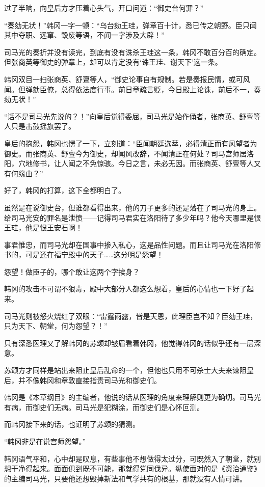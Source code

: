 过了半晌，向皇后方才压着心头气，开口问道：“御史台何罪？”

“奏劾无状！”韩冈一字一顿：“乌台劾王珪，弹章百十计，悉已传之朝野。臣只闻其中夺职、远窜、毁废等语，不闻一字涉及大辟！”

司马光的奏折并没有读完，到底有没有诛杀王珪这一条，韩冈不敢百分百的确定。但张商英等御史的弹章上，却可以肯定没有‘诛王珪、谢天下’这一条。

韩冈双目一扫张商英、舒亶等人，“御史论事自有规制。若是奏报民情，或可风闻。但弹劾臣僚，总得依法度行事。前日章疏言贬，今日殿上论诛，前后不一，奏劾无状！”

“话不是司马光先说的？！”向皇后觉得委屈，司马光是始作俑者，张商英、舒亶等人只是击鼓摇旗罢了。

皇后的抱怨，韩冈也愣了一下，立刻道：“臣闻朝廷选萃，必得清正而有风望者为御史。而张商英、舒亶今为御史，却闻风改辞，不闻清正在何处？司马宫师居洛阳，穴地修书，让人闻之不免惊骇。今日之言，未必无因。而张商英、舒亶等人又有何缘由？”

好了，韩冈的打算，这下全都明白了。

虽然是在说御史台，但谁都看得出来，他的刀子更多的还是落在了司马光的身上。给司马光安的罪名是泄愤——记得司马君实在洛阳待了多少年吗？他今天哪里是恨王珪，他是恨王安石啊！

事君惟忠，而司马光却在国事中掺入私心，这是品性问题。而且让司马光在洛阳修书的，可是还在福宁殿中的天子……这分明是怨望！

怨望！做臣子的，哪个敢让这两个字挨身？

韩冈的攻击不可谓不狠毒，殿中大部分人都这么想着，皇后的心情也一下好了起来。

司马光则被怒火烧红了双眼：“雷霆雨露，皆是天恩，此理臣岂不知？臣劾王珪，只为天下、朝堂，何为怨望？！”

只有深悉医理又了解韩冈的苏颂却皱眉看着韩冈，他觉得韩冈的话似乎还有一层深意。

苏颂方才同样是站出来阻止皇后乱命的一个，但他也只用不可杀士大夫来谏阻皇后，并不像韩冈和章敦直接指责司马光和御史们。

韩冈是《本草纲目》的主编者，他说的话从医理的角度来理解则更为确切。司马光有病，而御史们无病。司马光是犯糊涂，而御史们是心怀叵测。

而韩冈接下来的话，也证明了苏颂的猜测。

“韩冈非是在说宫师怨望。”

韩冈语气平和，心中却是叹息，有些事他不想做得太过分，可既然入了朝堂，就别想干净得起来。面面俱到既不可能，那就得党同伐异。纵使面对的是《资治通鉴》的主编司马光，只要他还想毁掉新法和气学共有的根基，那就没有人情可讲。

